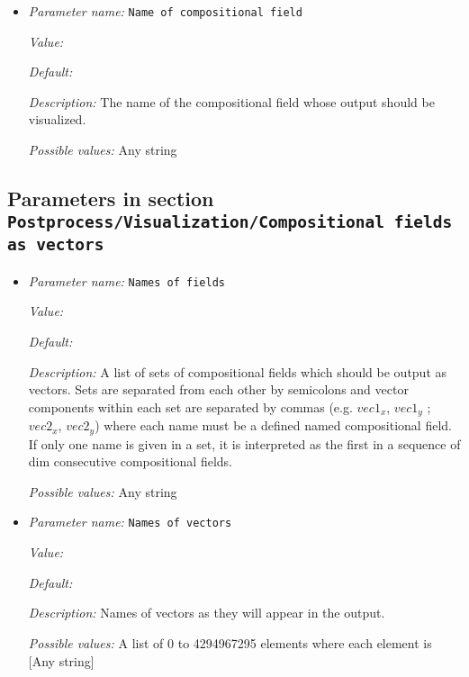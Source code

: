 \begin{itemize}
\item {\it Parameter name:} {\tt Name of compositional field}
\label{parameters:Postprocess/Visualization/Artificial viscosity composition/Name of compositional field}


{\it Value:} 


{\it Default:} 


{\it Description:} The name of the compositional field whose output should be visualized. 


{\it Possible values:} Any string
\end{itemize}

\subsection{Parameters in section \tt Postprocess/Visualization/Compositional fields as vectors}
\label{parameters:Postprocess/Visualization/Compositional_20fields_20as_20vectors}

\begin{itemize}
\item {\it Parameter name:} {\tt Names of fields}
\label{parameters:Postprocess/Visualization/Compositional fields as vectors/Names of fields}


{\it Value:} 


{\it Default:} 


{\it Description:} A list of sets of compositional fields which should be output as vectors. Sets are separated from each other by semicolons and vector components within each set are separated by commas (e.g. $vec1_x$, $vec1_y$ ; $vec2_x$, $vec2_y$) where each name must be a defined named compositional field. If only one name is given in a set, it is interpreted as the first in a sequence of dim consecutive compositional fields.


{\it Possible values:} Any string
\item {\it Parameter name:} {\tt Names of vectors}
\label{parameters:Postprocess/Visualization/Compositional fields as vectors/Names of vectors}


{\it Value:} 


{\it Default:} 


{\it Description:} Names of vectors as they will appear in the output.


{\it Possible values:} A list of 0 to 4294967295 elements where each element is [Any string]
\end{itemize}

